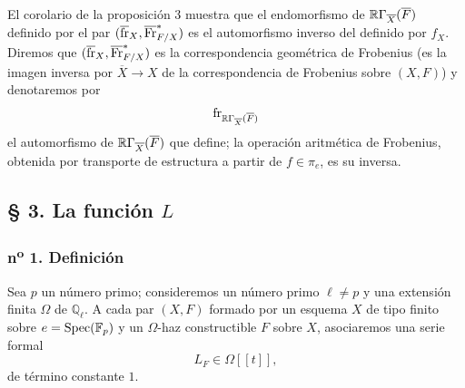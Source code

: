 El corolario de la proposición 3 muestra que el endomorfismo de $\mathbb{R}\Gamma_{\overline X}(\overline F)$ definido por el par $(\overline{\operatorname{fr}}_X,\overline{\operatorname{Fr}}^*_{F/X})$ es el automorfismo inverso del definido por $f_X$. Diremos que $(\overline{\operatorname{fr}}_X,\overline{\operatorname{Fr}}^*_{F/X})$ es la correspondencia geométrica de Frobenius (es la imagen inversa por $\overline X\to X$ de la correspondencia de Frobenius sobre $(X,F)$) y denotaremos por
\[
\operatorname{fr}_{\mathbb{R}\Gamma_{\overline X}(\overline F)}
\]
el automorfismo de $\mathbb{R}\Gamma_{\overline X}(\overline F)$ que define; la operación aritmética de Frobenius, obtenida por transporte de estructura a partir de $f\in\pi_e$, es su inversa.

\subsection*{§ 3. La función $L$}

\subsubsection*{n\textsuperscript{o} 1. Definición}

Sea $p$ un número primo; consideremos un número primo $\ell\ne p$ y una extensión finita $\Omega$ de $\mathbb Q_\ell$. A cada par $(X,F)$ formado por un esquema $X$ de tipo finito sobre $e=\operatorname{Spec}(\mathbb F_p)$ y un $\Omega$-haz constructible $F$ sobre $X$, asociaremos una serie formal
\[
L_F\in\Omega[[t]],
\]
de término constante $1$.


